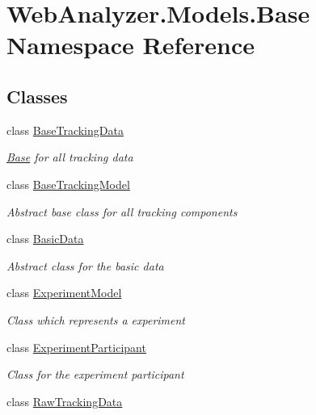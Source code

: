 \hypertarget{namespace_web_analyzer_1_1_models_1_1_base}{}\section{Web\+Analyzer.\+Models.\+Base Namespace Reference}
\label{namespace_web_analyzer_1_1_models_1_1_base}
\subsection*{Classes}
\begin{DoxyCompactItemize}
\item 
class \hyperlink{class_web_analyzer_1_1_models_1_1_base_1_1_base_tracking_data}{Base\+Tracking\+Data}
\begin{DoxyCompactList}\small\item\em \hyperlink{namespace_web_analyzer_1_1_models_1_1_base}{Base} for all tracking data \end{DoxyCompactList}\item 
class \hyperlink{class_web_analyzer_1_1_models_1_1_base_1_1_base_tracking_model}{Base\+Tracking\+Model}
\begin{DoxyCompactList}\small\item\em Abstract base class for all tracking components \end{DoxyCompactList}\item 
class \hyperlink{class_web_analyzer_1_1_models_1_1_base_1_1_basic_data}{Basic\+Data}
\begin{DoxyCompactList}\small\item\em Abstract class for the basic data \end{DoxyCompactList}\item 
class \hyperlink{class_web_analyzer_1_1_models_1_1_base_1_1_experiment_model}{Experiment\+Model}
\begin{DoxyCompactList}\small\item\em Class which represents a experiment \end{DoxyCompactList}\item 
class \hyperlink{class_web_analyzer_1_1_models_1_1_base_1_1_experiment_participant}{Experiment\+Participant}
\begin{DoxyCompactList}\small\item\em Class for the experiment participant \end{DoxyCompactList}\item 
class \hyperlink{class_web_analyzer_1_1_models_1_1_base_1_1_raw_tracking_data}{Raw\+Tracking\+Data}

\end{DoxyCompactItemize}
